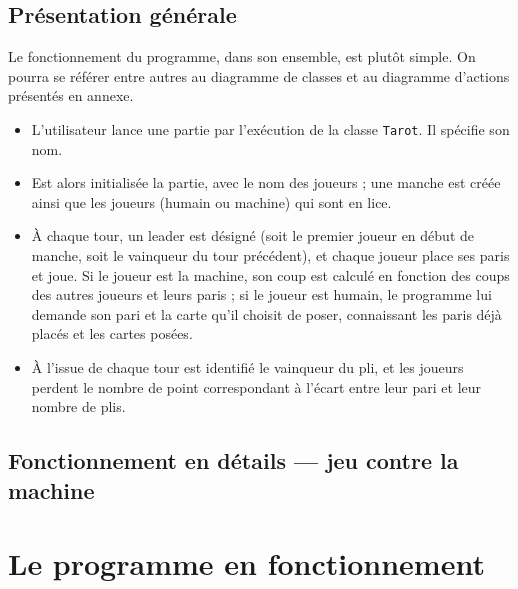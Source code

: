    \subsection{Présentation générale}\label{subsec:présentation-générale}
      Le fonctionnement du programme, dans son ensemble, est plutôt simple.
      On pourra se référer entre autres au diagramme de classes et au diagramme d'actions présentés en annexe.
      \begin{itemize}
         \item L'utilisateur lance une partie par l'exécution de la classe \texttt{Tarot}.
         Il spécifie son nom.
         \item Est alors initialisée la partie, avec le nom des joueurs ;
         une manche est créée ainsi que les joueurs (humain ou machine) qui sont en lice.
         \item À chaque tour, un leader est désigné (soit le premier joueur en début de manche, soit le vainqueur du tour précédent), et chaque joueur place ses paris et joue.
         Si le joueur est la machine, son coup est calculé en fonction des coups des autres joueurs et leurs paris ;
         si le joueur est humain, le programme lui demande son pari et la carte qu'il choisit de poser, connaissant les paris déjà placés et les cartes posées.
         \item À l'issue de chaque tour est identifié le vainqueur du pli, et les joueurs perdent le nombre de point correspondant à l'écart entre leur pari et leur nombre de plis.
      \end{itemize}


   \subsection{Fonctionnement en détails --- jeu contre la machine}\label{subsec:fonctionnement-en-détails-----jeu-contre-la-machine}


\section{Le programme en fonctionnement}\label{sec:le-programme-en-fonctionnement}


